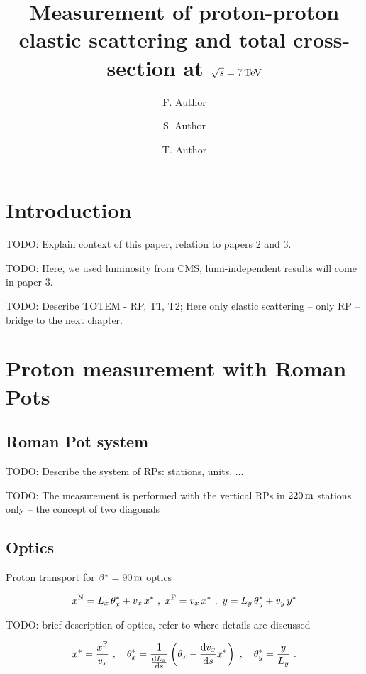 \documentclass[doublecol]{../macros/epl2}
\title{Measurement of proton-proton elastic scattering and total cross-section at $\sqrt s = 7\,\rm TeV$}
\author{F. Author\inst{1,2} \and S. Author\inst{1} \and T. Author\inst{2}}
\institute{                    
  \inst{1} First Institute - Address\\
  \inst{2} Second Institute - Address
}
\def\d{{\rm d}}
\def\un#1{\,{\rm #1}}
\begin{document}
\maketitle

\section{Introduction}

TODO: Explain context of this paper, relation to papers 2 and 3.

TODO: Here, we used luminosity from CMS, lumi-independent results will come in paper 3.

TODO: Describe TOTEM - RP, T1, T2; Here only elastic scattering -- only RP -- bridge to the next chapter.


\section{Proton measurement with Roman Pots}

\subsection{Roman Pot system}

TODO: Describe the system of RPs: stations, units, ...

TODO: The measurement is performed with the vertical RPs in $220\un{m}$ stations only -- the concept of two diagonals

\subsection{Optics}

Proton transport for $\beta^* = 90\un{m}$ optics

\begin{equation}
\label{transport}
x^{\rm N} = L_x\,\theta^*_x + v_x\,x^*\ ,\ 
x^{\rm F} = v_x\,x^*\ ,\ 
y = L_y\,\theta^*_y + v_y\,y^*
\end{equation}


TODO: brief description of optics, refer to \cite{epl96} where details are discussed

\begin{equation}
\label{reconstruction}
x^* = {x^{\rm F}\over v_x}\ ,\quad
\theta^*_x = {1\over {\d L_x\over \d s}} \left( \theta_x - {\d v_x\over \d s} x^* \right)\ ,\quad
\theta^*_y = {y\over L_y}\ .
\end{equation}
\end{document}
